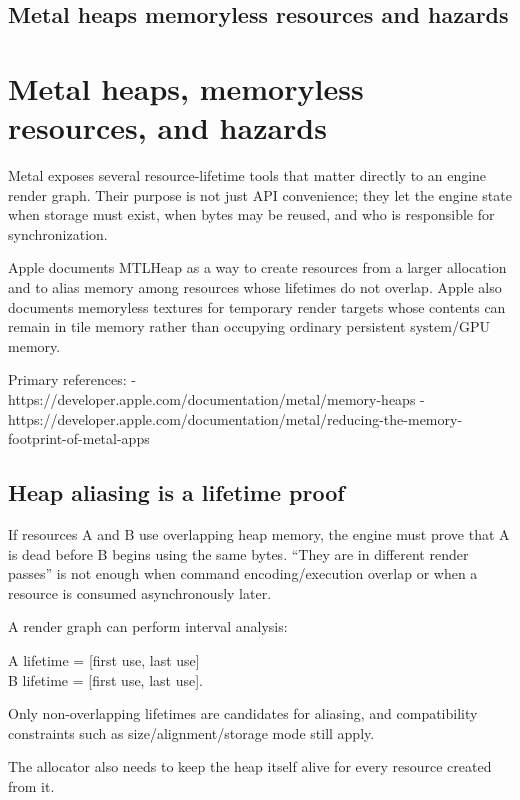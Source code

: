 \hypertarget{appendix-563b2cb23fc3}{}
\section*{Metal heaps memoryless resources and hazards}
\chapter{Metal heaps, memoryless resources, and hazards}\label{appendix-563b2cb23fc3-metal-heaps-memoryless-resources-and-hazards}

Metal exposes several resource-lifetime tools that matter directly to an engine render graph. Their purpose is not just API convenience; they let the engine state when storage must exist, when bytes may be reused, and who is responsible for synchronization.

Apple documents MTLHeap as a way to create resources from a larger allocation and to alias memory among resources whose lifetimes do not overlap. Apple also documents memoryless textures for temporary render targets whose contents can remain in tile memory rather than occupying ordinary persistent system/GPU memory.

Primary references: - https://developer.apple.com/documentation/metal/memory-heaps - https://developer.apple.com/documentation/metal/reducing-the-memory-footprint-of-metal-apps

\section{Heap aliasing is a lifetime proof}\label{appendix-563b2cb23fc3-heap-aliasing-is-a-lifetime-proof}

If resources A and B use overlapping heap memory, the engine must prove that A is dead before B begins using the same bytes. ``They are in different render passes'' is not enough when command encoding/execution overlap or when a resource is consumed asynchronously later.

A render graph can perform interval analysis:

A lifetime = {[}first use, last use{]}\\
B lifetime = {[}first use, last use{]}.

Only non-overlapping lifetimes are candidates for aliasing, and compatibility constraints such as size/alignment/storage mode still apply.

The allocator also needs to keep the heap itself alive for every resource created from it.

